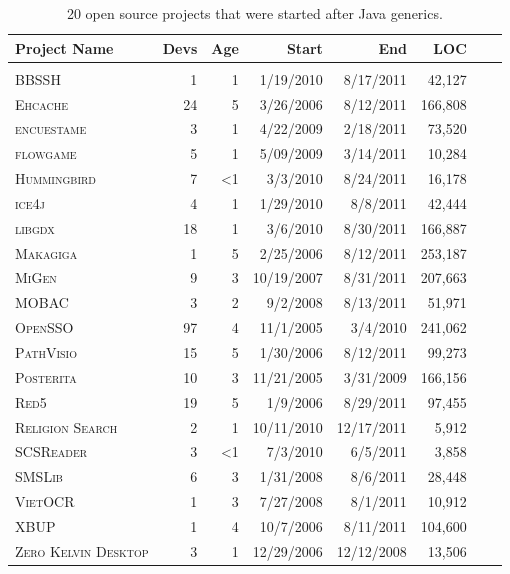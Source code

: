 \documentclass{svjour3}
\newcommand{\bbssh}{\textsc{BBSSH}\xspace}
\newcommand{\ehcache}{\textsc{Ehcache}\xspace}
\newcommand{\encuestame}{\textsc{encuestame}\xspace}
\newcommand{\flowgame}{\textsc{flowgame}\xspace}
\newcommand{\hummingbird}{\textsc{Hummingbird}\xspace}
\newcommand{\ice}{\textsc{ice4j}\xspace}
\newcommand{\libgdx}{\textsc{libgdx}\xspace}
\newcommand{\makagiga}{\textsc{Makagiga}\xspace}
\newcommand{\migen}{\textsc{MiGen}\xspace}
\newcommand{\mobac}{\textsc{MOBAC}\xspace}
\newcommand{\pathvisio}{\textsc{PathVisio}\xspace}
\newcommand{\posterita}{\textsc{Posterita}\xspace}
\newcommand{\opensso}{\textsc{OpenSSO}\xspace}
\newcommand{\smslib}{\textsc{SMSLib}\xspace}
\newcommand{\scsreader}{\textsc{SCSReader}\xspace}
\newcommand{\religion}{\textsc{Religion Search}\xspace}
\newcommand{\red}{\textsc{Red5}\xspace}
\newcommand{\vietocr}{\textsc{VietOCR}\xspace}
\newcommand{\xbup}{\textsc{XBUP}\xspace}
\newcommand{\zkdesktop}{\textsc{Zero Kelvin Desktop}\xspace}
\begin{document}
\begin{table}[ht]

\begin{center}
\begin{tabular*}{12.5cm}{@{\extracolsep{\fill}}p{4cm}rrrrrrr}

\textbf{Project Name} &\textbf{Devs}&\textbf{Age}&\textbf{Start}&\textbf{End}&	 \textbf{LOC} \\
\hline\\
\bbssh         			&	1			&	1						&	1/19/2010 	&	8/17/2011 	&		42,127	\\[1mm]
\ehcache	    			&	24		&	5						&	3/26/2006 	&	8/12/2011 	&		166,808	\\[1mm]
\encuestame					&	3			&	1						&	4/22/2009 	&	2/18/2011 	&		73,520	\\[1mm]
\flowgame 					&	5			&	1						&	5/09/2009 	&	3/14/2011 	&		10,284	\\[1mm]
\hummingbird				&	7			&	\textless 1	&	3/3/2010 		&	8/24/2011 	&		16,178	\\[1mm]
\ice								&	4			&	1						&	1/29/2010		&	8/8/2011 		&		42,444	\\[1mm]
\libgdx							&	18		&	1						&	3/6/2010 		&	8/30/2011 	&	166,887		\\[1mm]
\makagiga						&	1			&	5						&	2/25/2006 	&	8/12/2011 	&	253,187\\[1mm]
\migen							&	9			&	3						&	10/19/2007 	&	8/31/2011		& 207,663\\[1mm]
\mobac							&	3			&	2						&	9/2/2008 		&	8/13/2011 	& 51,971\\[1mm]
\opensso						&	97		&	4						&	11/1/2005 	&	3/4/2010 		& 241,062\\[1mm]
\pathvisio					&	15		&	5						&	1/30/2006 	&	8/12/2011 	& 99,273\\[1mm]
\posterita					&	10		&	3						&	11/21/2005 	&	3/31/2009 	& 166,156\\[1mm]
\red								&	19		&	5						&	1/9/2006 		&	8/29/2011 	& 97,455\\[5mm]
\religion						&	2			&	1						&	10/11/2010 	&	12/17/2011 	& 5,912\\[1mm]
\scsreader					&	3			&	\textless 1	&	7/3/2010 		&	6/5/2011 		&		3,858\\[1mm]
\smslib							&	6			&	3						&	1/31/2008 	&	8/6/2011 		& 28,448\\[1mm]
\vietocr						&	1			&	3						&	7/27/2008 	&	8/1/2011 		& 10,912\\[1mm]
\xbup								&	1			&	4						&	10/7/2006 	&	8/11/2011 	& 104,600\\[1mm]
\zkdesktop					&	3			&	1						&	12/29/2006 	&	12/12/2008 	& 13,506\\[1mm] 
\end{tabular*}
\end{center}
\caption{20 open source projects that were started after Java generics.}
\label{table:20recentprojects}
\end{table}
\end{document}
